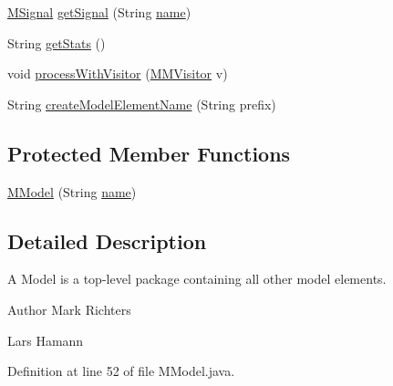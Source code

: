 \begin{DoxyCompactItemize}
\hyperlink{interfaceorg_1_1tzi_1_1use_1_1uml_1_1mm_1_1commonbehavior_1_1communications_1_1_m_signal}{M\-Signal} \hyperlink{classorg_1_1tzi_1_1use_1_1uml_1_1mm_1_1_m_model_afb7902da058b1d93cdef027f5aec8b4e}{get\-Signal} (String \hyperlink{classorg_1_1tzi_1_1use_1_1uml_1_1mm_1_1_m_model_element_impl_ac9997b04c10d247c21c22d431d99400d}{name})
\item 
String \hyperlink{classorg_1_1tzi_1_1use_1_1uml_1_1mm_1_1_m_model_af220a5c1f26fa67d66c115a1c77b4e2a}{get\-Stats} ()
\item 
void \hyperlink{classorg_1_1tzi_1_1use_1_1uml_1_1mm_1_1_m_model_a7653270900beceabd7bcaa65afc0b300}{process\-With\-Visitor} (\hyperlink{interfaceorg_1_1tzi_1_1use_1_1uml_1_1mm_1_1_m_m_visitor}{M\-M\-Visitor} v)
\item 
String \hyperlink{classorg_1_1tzi_1_1use_1_1uml_1_1mm_1_1_m_model_a8c1e0f0d29b22f367e73399be955ec2c}{create\-Model\-Element\-Name} (String prefix)
\end{DoxyCompactItemize}
\subsection*{Protected Member Functions}
\begin{DoxyCompactItemize}
\item 
\hyperlink{classorg_1_1tzi_1_1use_1_1uml_1_1mm_1_1_m_model_a2f16935e43efd49c795be2cd614993a4}{M\-Model} (String \hyperlink{classorg_1_1tzi_1_1use_1_1uml_1_1mm_1_1_m_model_element_impl_ac9997b04c10d247c21c22d431d99400d}{name})
\end{DoxyCompactItemize}


\subsection{Detailed Description}
A Model is a top-\/level package containing all other model elements.

\begin{DoxyAuthor}{Author}
Mark Richters 

Lars Hamann 
\end{DoxyAuthor}


Definition at line 52 of file M\-Model.\-java.



